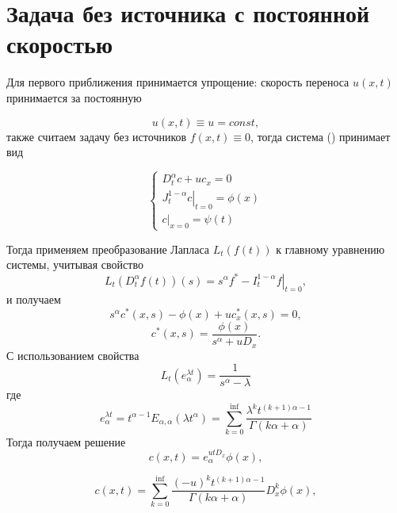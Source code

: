 \section{Задача без источника с постоянной скоростью}

Для первого приближения принимается упрощение: скорость переноса $u(x,t)$ принимается за постоянную

\begin{equation}
	u(x,t) \equiv u = const,
\end{equation}
также считаем задачу без источников $f(x,t)\equiv0$, тогда система (\label{eq:def_0}) принимает вид

\begin{equation}
	\label{eq:an_0}
	\begin{cases}
		D^\alpha_t c + uc_x = 0\\
		\left.J^{1-\alpha}_tc\right|_{t=0} = \phi(x)\\
		\left.c\right|_{x=0}=\psi(t)
	\end{cases}
\end{equation}

Тогда применяем преобразование Лапласа $L_t(f(t))$ к главному уравнению системы, учитывая свойство
\begin{equation}
	L_t(D^\alpha_tf(t))(s) = s^\alpha f^* - \left. I^{1-\alpha}_tf \right|_{t=0},
\end{equation}
и получаем
\begin{equation}
	s^\alpha c^*(x,s) - \phi(x) + u c^*_x(x,s) = 0,
\end{equation}
\begin{equation}
	c^*(x,s) = \frac{\phi(x)}{s^\alpha + u D_x}.
\end{equation}
С использованием свойства
\begin{equation}
	L_t(e^{\lambda t}_{\alpha}) = \frac{1}{s^\alpha-\lambda}
\end{equation}
где
\begin{equation}
e^{\lambda t}_{\alpha} =
t^{\alpha - 1} E_{\alpha, \alpha}(\lambda t^{\alpha}) =
\sum_{k = 0}^{\inf}\frac{\lambda^k t^{(k+1)\alpha - 1}}{\Gamma(k\alpha + \alpha)}
\end{equation}
Тогда получаем решение
\begin{equation}
	c(x,t) = e^{utD_x}_{\alpha} \phi(x),
\end{equation}

\begin{equation}
	c(x,t) = \sum_{k = 0}^{\inf}\frac{(-u)^k t^{(k+1)\alpha - 1}}{\Gamma(k\alpha + \alpha)} D^k_x \phi(x),
\end{equation}
